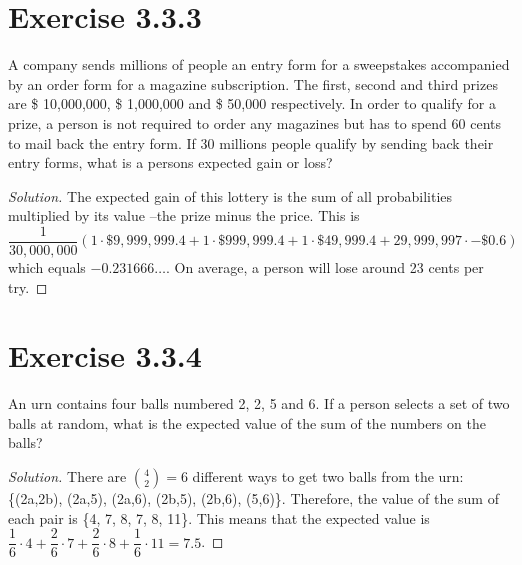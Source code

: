 \documentclass[titlepage, letterpaper, fleqn]{article}
\newcommand{\spacepls}{\vspace{5mm}}
\renewcommand\qedsymbol{\(\blacksquare\)}
\newenvironment{solution}
{\renewcommand\qedsymbol{$\square$}\begin{proof}[Solution]}
{\end{proof}}
\begin{document}
\section{Exercise 3.3.3}

{\large A company sends millions of people an entry form for a sweepstakes accompanied by an order form for a magazine subscription.
The first, second and third prizes are \$ 10,000,000, \$ 1,000,000 and \$ 50,000 respectively.
In order to qualify for a prize, a person is not required to order any magazines but has to spend 60 cents to mail back the entry form.
If 30 millions people qualify by sending back their entry forms, what is a persons expected gain or loss?}

\begin{solution}
The expected gain of this lottery is the sum of all probabilities multiplied by its value –the prize minus the price.
This is \(\dfrac{1}{30,000,000} (1 \cdot \$ 9,999,999.4 + 1 \cdot \$ 999,999.4 + 1 \cdot \$ 49,999.4 + 29,999,997 \cdot - \$ 0.6)\) which equals \(-0.231666\dots\).
On average, a person will lose around 23 cents per try.
\end{solution}

\spacepls

\section{Exercise 3.3.4}

{\large An urn contains four balls numbered 2, 2, 5 and 6.
If a person selects a set of two balls at random, what is the expected value of the sum of the numbers on the balls?}

\begin{solution}
There are \(\binom{4}{2} = 6\) different ways to get two balls from the urn: \{(2a,2b), (2a,5), (2a,6), (2b,5), (2b,6), (5,6)\}.
Therefore, the value of the sum of each pair is \{4, 7, 8, 7, 8, 11\}.
This means that the expected value is \(\dfrac{1}{6} \cdot 4 + \dfrac{2}{6} \cdot 7 + \dfrac{2}{6} \cdot 8 + \dfrac{1}{6} \cdot 11 = 7.5\).
\end{solution}
\end{document}
